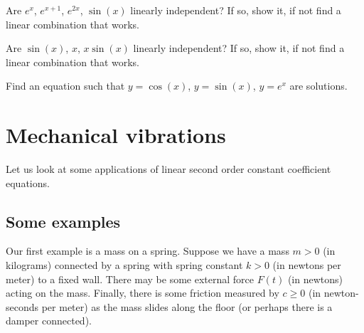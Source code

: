 \documentclass[12pt]{book}
\begin{document}
\begin{exercise}
Are $e^{x}$, $e^{x+1}$, $e^{2x}$, $\sin(x)$ linearly independent?
If so, show it, if not find a linear combination that works.
\end{exercise}

\begin{exercise}
Are $\sin(x)$, $x$, $x\sin(x)$ linearly independent?
If so, show it, if not find a linear combination that works.
\end{exercise}

\begin{exercise}
Find an equation such that $y=\cos(x)$, $y=\sin(x)$, $y=e^x$ are solutions.
\end{exercise}


\sectionnewpage
\section{Mechanical vibrations} \label{sec:mv}


Let us look at some applications of linear second order constant
coefficient equations.

\subsection{Some examples}

\begin{diffyfloatingfigure}{2.0in}{2.3in}
\noindent
{}
\end{diffyfloatingfigure}
Our first example is a mass on a spring.  Suppose we have a mass $m > 0$
(in kilograms) connected
by a spring with spring constant $k > 0$ (in newtons per meter)
to a fixed wall.  There may be some external
force $F(t)$ (in newtons) acting on the mass.  Finally, there is some
friction measured by $c \geq 0$ (in newton-seconds per meter) as the mass
slides along the floor (or perhaps there is a damper connected).
\end{document}
